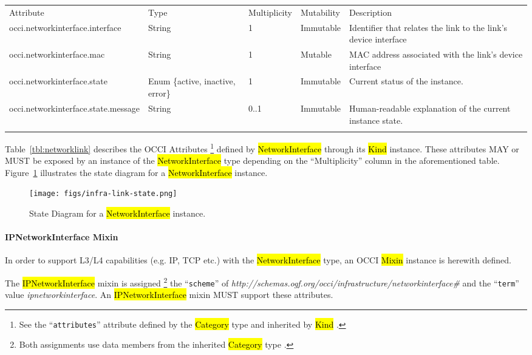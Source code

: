 \documentclass[10pt,a4paper]{article}
\begin{document}
{
	\begin{tabular}{lp{2.5cm}p{1cm}lp{5cm}}
	\toprule
	Attribute&Type&Multi\-plicity&Mutability&Description\\
	\colrule
	occi.networkinterface.interface & String & 1 & Immutable
	& Identifier that relates the link to the link's device interface\\
	occi.networkinterface.mac & String & 1 & Mutable
	& MAC address associated with the link's device interface\\
	occi.networkinterface.state & Enum \{active, inactive, error\}& 1
	& Immutable & Current status of the instance.\\
	occi.networkinterface.state.message & String & 0..1 & Immutable
	& Human-readable explanation of the current instance state.\\
	\botrule
	\end{tabular}
}

Table~\ref{tbl:networklink} describes the OCCI Attributes%
\footnote{See the ``{\tt attributes}'' attribute defined by the
  \hl{Category} type and inherited by \hl{Kind} \cite{occi:core}.}
defined by \hl{NetworkInterface} through its \hl{Kind} instance. These
attributes MAY or MUST be exposed by an instance of the \hl{NetworkInterface} type
depending on the ``Multiplicity'' column in the aforementioned table.
Figure~\ref{fig:networklink_state} illustrates the state
diagram for a \hl{NetworkInterface} instance.

\begin{figure}[!h]
	\centering
	\texttt{[image: figs/infra-link-state.png]}
	\caption{State Diagram for a \hl{NetworkInterface} instance.}
	\label{fig:networklink_state}
\end{figure}

\paragraph{IPNetworkInterface Mixin}
In order to support L3/L4 capabilities (e.g. IP, TCP etc.) with the
\hl{NetworkInterface} type, an OCCI \hl{Mixin} instance is herewith
defined.

The \hl{IPNetworkInterface} mixin is assigned%
\footnote{Both assignments use data members from the inherited \hl{Category}
type \cite{occi:core}.}
the ``{\tt scheme}'' of
\textit{http://schemas.ogf.org/occi/infrastructure/networkinterface\#} and the ``{\tt term}'' value
\textit{ipnetworkinterface}.
An \hl{IPNetworkInterface} mixin MUST support these attributes.
\end{document}
